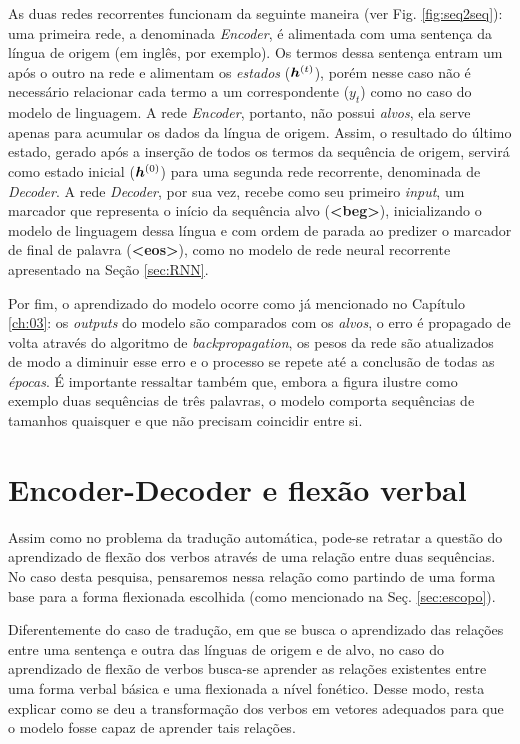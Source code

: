 As duas redes recorrentes funcionam da seguinte maneira (ver Fig. \ref{fig:seq2seq}): uma primeira rede, a denominada \textit{Encoder}, é alimentada com uma sentença da língua de origem (em inglês, por exemplo). Os termos dessa sentença entram um após o outro na rede e alimentam os \textit{estados} ($\bm{h}^{(t)}$), porém nesse caso não é necessário relacionar cada termo a um correspondente ($y_t$) como no caso do modelo de linguagem. A rede \textit{Encoder}, portanto, não possui \textit{alvos}, ela serve apenas para acumular os dados da língua de origem. Assim, o resultado do último estado, gerado após a inserção de todos os termos da sequência de origem, servirá como estado inicial ($\bm{h}^{(0)}$) para uma segunda rede recorrente, denominada de \textit{Decoder}. A rede \textit{Decoder}, por sua vez, recebe como seu primeiro \textit{input}, um marcador que representa o início da sequência alvo (\textbf{<beg>}), inicializando o modelo de linguagem dessa língua e com ordem de parada ao predizer o marcador de final de palavra (\textbf{<eos>}), como no modelo de rede neural recorrente apresentado na Seção \ref{sec:RNN}. 

 
 
 Por fim, o aprendizado do modelo ocorre como já mencionado no Capítulo \ref{ch:03}: os \textit{outputs} do modelo são comparados com os \textit{alvos}, o erro é propagado de volta através do algoritmo de \textit{backpropagation}, os pesos da rede são atualizados de modo a diminuir esse erro e o processo se repete até a conclusão de todas as \textit{épocas}. É importante ressaltar também que, embora a figura ilustre como exemplo duas sequências de três palavras, o modelo comporta sequências de tamanhos quaisquer e que não precisam coincidir entre si.
 
\section{Encoder-Decoder e flexão verbal}

Assim como no problema da tradução automática, pode-se retratar a questão do aprendizado de flexão dos verbos através de uma relação entre duas sequências. No caso desta pesquisa, pensaremos nessa relação como partindo de uma forma base para a forma flexionada escolhida (como mencionado na Seç. \ref{sec:escopo}).



Diferentemente do caso de tradução, em que se busca o aprendizado das relações entre uma sentença e outra das línguas de origem e de alvo, no caso do aprendizado de flexão de verbos busca-se aprender as relações existentes entre uma forma verbal básica e uma flexionada a nível fonético. Desse modo, resta explicar como se deu a transformação dos verbos em vetores adequados para que o modelo fosse capaz de aprender tais relações.


